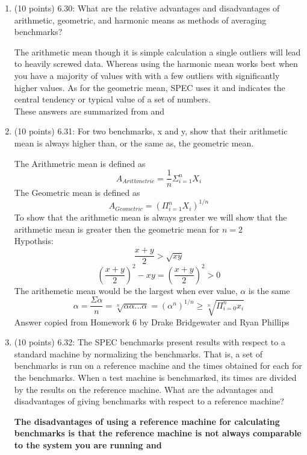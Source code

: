 \documentclass[letterpaper,10pt,onecolumn,titlepage]{article}
\begin{document}
\begin{enumerate}
\item (10 points) 6.30: What are the relative advantages and disadvantages of arithmetic, geometric, and harmonic means as methods of averaging benchmarks?\\
\begin{mdframed}[style=MyFrame]
The arithmetic mean though it is simple calculation a single outliers will lead to heavily screwed data. Whereas using the harmonic mean works best when you have a majority of values with with a few outliers with significantly higher values. As for the geometric mean, SPEC uses it and indicates the central tendency or typical value of a set of numbers. \\
These answers are summarized from \cite[The Economist at Large]{MeansDiff} and \cite[Wikipedia]{MeansWiki}
\end{mdframed}
\newpage
\item (10 points) 6.31: For two benchmarks, x and y, show that their arithmetic mean is always higher than, or the same as, the geometric mean.
\begin{mdframed}[style=MyFrame]
The Arithmetric mean is defined as 
\begin{equation}
A_{Arithmetric}=\frac{1}{n}\Sigma_{i=1}^nX_i
\end{equation}
The Geometric mean is defined as 
\begin{equation} 
A_{Geometric}=(\Pi_{i=1}^nX_i)^{1/n}
\end{equation}
To show that the arithmetic mean is always greater we will show that the arithmetic mean is greater then the geometric mean for $n=2$\\
Hypothsis:\begin{equation}
\frac{x+y}{2}>\sqrt{xy}
\end{equation}
\begin{equation}
(\frac{x+y}{2})^2-xy = (\frac{x+y}{2})^2 > 0
\end{equation}
The arithemetic mean would be the largest when ever value, $\alpha$ is the same
\begin{equation}
\alpha=\frac{\Sigma \alpha}{n}=\sqrt[n]{\alpha \alpha...\alpha}=(\alpha^n)^{1/n} \geq \sqrt[n]{\Pi_{i=0}^n x_i}
\end{equation}
Answer copied from Homework 6 by Drake Bridgewater and Ryan Phillips \cite{HW6}
\end{mdframed}
\item (10 points) 6.32: The SPEC benchmarks present results with respect to a standard machine by normalizing the benchmarks. That is, a set of benchmarks is run on a reference machine and the times obtained for each for the benchmarks. When a test machine is benchmarked, its times are divided by the results on the reference machine. What are the advantages and disadvantages of giving benchmarks with respect to a reference machine?
\begin{mdframed}[style=MyFrame, backgroundcolor=red]
\textbf{ The disadvantages of using a reference machine for calculating benchmarks is that the reference machine is not always comparable to the system you are running and }


\end{mdframed}
\end{enumerate}
\end{document}

